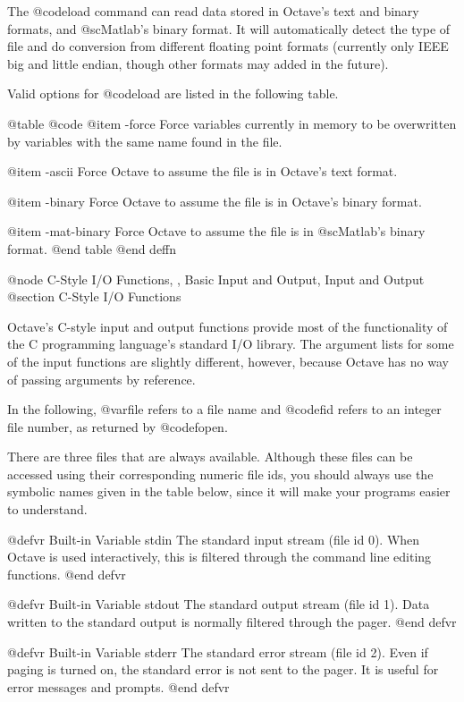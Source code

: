 The @code{load} command can read data stored in Octave's text and
binary formats, and @sc{Matlab}'s binary format.  It will automatically
detect the type of file and do conversion from different floating point
formats (currently only IEEE big and little endian, though other formats
may added in the future).

Valid options for @code{load} are listed in the following table.

@table @code
@item -force
Force variables currently in memory to be overwritten by variables with
the same name found in the file.

@item -ascii
Force Octave to assume the file is in Octave's text format.

@item -binary
Force Octave to assume the file is in Octave's binary format.

@item -mat-binary
Force Octave to assume the file is in @sc{Matlab}'s binary format.
@end table
@end deffn

@node C-Style I/O Functions,  , Basic Input and Output, Input and Output
@section C-Style I/O Functions

Octave's C-style input and output functions provide most of the
functionality of the C programming language's standard I/O library.  The
argument lists for some of the input functions are slightly different,
however, because Octave has no way of passing arguments by reference.

In the following, @var{file} refers to a file name and @code{fid} refers
to an integer file number, as returned by @code{fopen}.

There are three files that are always available.  Although these files
can be accessed using their corresponding numeric file ids, you should
always use the symbolic names given in the table below, since it will
make your programs easier to understand.

@defvr {Built-in Variable} stdin
The standard input stream (file id 0).  When Octave is used
interactively, this is filtered through the command line editing
functions.
@end defvr

@defvr {Built-in Variable} stdout
The standard output stream (file id 1).  Data written to the
standard output is normally filtered through the pager.
@end defvr

@defvr {Built-in Variable} stderr
The standard error stream (file id 2).  Even if paging is turned on,
the standard error is not sent to the pager.  It is useful for error
messages and prompts.
@end defvr

